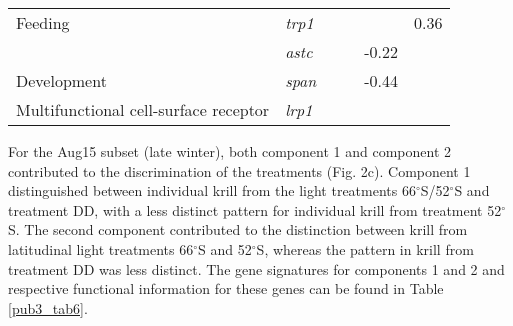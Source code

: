 \begin{table}[]
\begin{tabular}{@{}llllll@{}}
Feeding                               & \textit{trp1}   & \cellcolor[HTML]{C0C0C0}      &                & \cellcolor[HTML]{C0C0C0}      & 0.36     \\
                                      & \textit{astc}   & \cellcolor[HTML]{C0C0C0}      &                & \cellcolor[HTML]{C0C0C0}-0.22 &          \\
Development                           & \textit{span}   & \cellcolor[HTML]{C0C0C0}      &                & \cellcolor[HTML]{C0C0C0}-0.44 &          \\
Multifunctional cell-surface receptor & \textit{lrp1}   & \cellcolor[HTML]{C0C0C0}      &                & \cellcolor[HTML]{C0C0C0}      &          \\ \bottomrule
\end{tabular}
\end{table}

For the Aug15 subset (late winter), both component 1 and component 2
contributed to the discrimination of the treatments (Fig. 2c). Component 1
distinguished between individual krill from the light treatments
66$^{\circ}$S/52$^{\circ}$S and treatment DD, with a less distinct pattern for
individual krill from treatment 52$^{\circ}$S. The second component contributed
to the distinction between krill from latitudinal light treatments
66$^{\circ}$S and 52$^{\circ}$S, whereas the pattern in krill from treatment DD
was less distinct. The gene signatures for components 1 and 2 and respective
functional information for these genes can be found in  Table \ref{pub3_tab6}.


